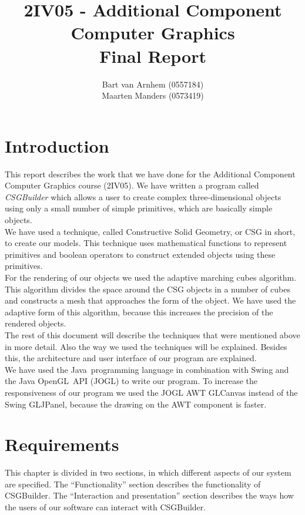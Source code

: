 \documentclass[a4paper,10pt,twoside]{report}
\title{2IV05 - Additional Component Computer Graphics \\ Final Report}
\author{Bart van Arnhem (0557184) \\ Maarten Manders (0573419)}
\begin{document}
\maketitle

\chapter{Introduction}
This report describes the work that we have done for the Additional Component Computer Graphics course (2IV05). We have written a program called \textit{CSGBuilder} which allows a user to create complex three-dimensional objects using only a small number of simple primitives, which are basically simple objects.\\

We have used a technique, called Constructive Solid Geometry, or CSG in short, to create our models. This technique uses mathematical functions to represent primitives and boolean operators to construct extended objects using these primitives.\\

For the rendering of our objects we used the adaptive marching cubes algorithm. This algorithm divides the space around the CSG objects in a number of cubes and constructs a mesh that approaches the form of the object. We have used the adaptive form of this algorithm, because this increases the precision of the rendered objects.\\

The rest of this document will describe the techniques that were mentioned above in more detail. Also the way we used the techniques will be explained. Besides this, the architecture and user interface of our program are explained.\\

We have used the Java\textcopyright\ programming language in combination with Swing and the Java OpenGL\texttrademark\ API (JOGL) to write our program. To increase the responsiveness of our program we used the JOGL AWT GLCanvas instead of the Swing GLJPanel, because the drawing on the AWT component is faster.

\tableofcontents

\chapter{Requirements}
This chapter is divided in two sections, in which different aspects of our system are specified. The ``Functionality'' section describes the functionality of CSGBuilder. The ``Interaction and presentation'' section describes the ways how the users of our software can interact with CSGBuilder.
\end{document}
